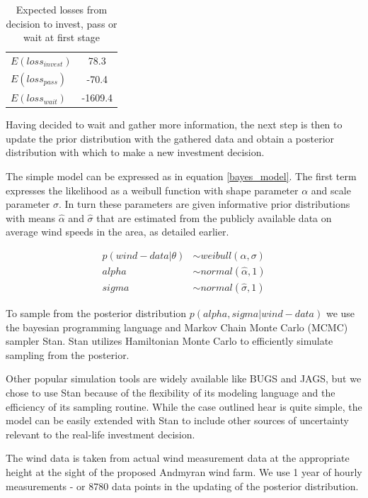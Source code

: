 \documentclass[11pt]{article}
\begin{document}
\begin{table}
\begin{center}
\begin{tabular}{l c}
$E(loss_{invest})$ & 78.3 \\
$E(loss_{pass})$ & -70.4 \\
$E(loss_{wait})$ & -1609.4 \\

\end{tabular}
\caption{Expected losses from decision to invest, pass or wait at first stage}
\label{table:expected_losses}
\end{center}
\end{table}

Having decided to wait and gather more information, the next step is then to update the prior distribution with the gathered data and obtain a posterior distribution with which to make a new investment decision.

The simple model can be expressed as in equation \ref{bayes_model}. The first term expresses the likelihood as a weibull function with shape parameter $\alpha$ and scale parameter $\sigma$. In turn these parameters are given informative prior distributions with means $\hat{\alpha}$ and $\hat{\sigma}$ that are estimated from the publicly available data on average wind speeds in the area, as detailed earlier.   

\begin{align}
p(wind-data|\theta) &\sim weibull(\alpha, \sigma)\\
alpha &\sim normal(\hat{\alpha}, 1)\\
sigma &\sim normal(\hat{\sigma}, 1)
\label{bayes_model}
\end{align}

To sample from the posterior distribution $p(alpha, sigma|wind-data)$ we use the bayesian programming language and Markov Chain Monte Carlo (MCMC) sampler Stan. Stan utilizes Hamiltonian Monte Carlo to efficiently simulate sampling from the posterior. 

Other popular simulation tools are widely available like BUGS and JAGS, but we chose to use Stan because of the flexibility of its modeling language and the efficiency of its sampling routine. While the case outlined hear is quite simple, the model can be easily extended with Stan to include other sources of uncertainty relevant to the real-life investment decision.

The wind data is taken from actual wind measurement data at the appropriate height at the sight of the proposed Andmyran wind farm. We use 1 year of hourly measurements - or 8780 data points in the updating of the posterior distribution. 
\end{document}
